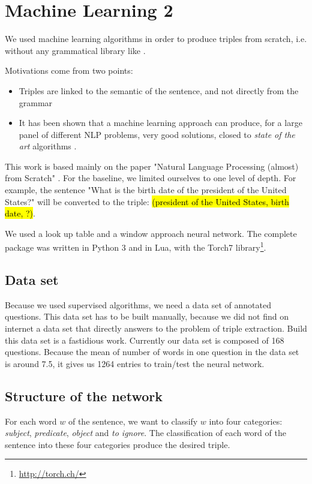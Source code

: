 \section{Machine Learning 2}


We used machine learning algorithms in order to produce triples from scratch, i.e. without any grammatical library like \Stanford.

Motivations come from two points:
\begin{itemize}
\item Triples are linked to the semantic of the sentence, and not directly from the grammar
\item It has been shown that a machine learning approach can produce, for a large panel of different NLP problems, very good solutions, closed to \textit{state of the art} algorithms \cite{collobert}.
\end{itemize}

This work is based mainly on the paper "Natural Language Processing (almost) from Scratch" \cite{collobert}.
For the baseline, we limited ourselves to one level of depth.
For example, the sentence "What is the birth date of the president of the United States?" will be converted to the triple: 
\hl{(president of the United States, birth date, ?)}. 

We used a look up table and a window approach neural network. The complete package was written in Python 3 and in Lua, with the Torch7 library\footnote{\url{http://torch.ch/}}.

\subsection{Data set}

Because we used supervised algorithms, we need a data set of annotated questions.
This data set has to be built manually, because we did not find on internet a data set that directly answers to the problem of triple extraction.
Build this data set is a fastidious work. Currently our data set is composed of 168 questions.
Because the mean of number of words in one question in the data set is around 7.5, it gives us 1264 entries to train/test the neural network.

\subsection{Structure of the network}

For each word $w$ of the sentence, we want to classify $w$ into four categories: \textit{subject}, \textit{predicate}, \textit{object} and \textit{to ignore}.
The classification of each word of the sentence into these four categories produce the desired triple.

